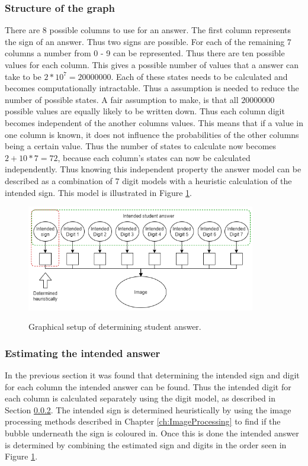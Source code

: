 \subsubsection{Structure of the graph}

There are 8 possible columns to use for an answer. The first column represents the sign of an answer. Thus two signs are possible. For each of the remaining 7 columns a number from 0 - 9 can be represented. Thus there are ten possible values for each column. This gives a possible number of values that a answer can take to be $2*10^7 = 20 000 000$. Each of these states needs to be calculated and becomes computationally intractable. Thus a assumption is needed to reduce the number of possible states. A fair assumption to make, is that all $20 000 000$ possible values are equally likely to be written down. Thus each column digit becomes independent of the another columns values. This means that if a value in one column is known, it does not influence the probabilities of the other columns being a certain value. Thus the number of states to calculate now becomes $2+10*7=72$, because each column's states can now be calculated independently. Thus knowing this independent property the answer model can be described as a combination of 7 digit models with a heuristic calculation of the intended sign. This model is illustrated in Figure \ref{fig:stdAns}.

\begin{figure}
  \centering
  \includegraphics[width=10cm]{ans}\\
  \caption{Graphical setup of determining student answer.}
  \label{fig:stdAns}
\end{figure}


\subsubsection{Estimating the intended answer}
\label{sec:intendedDigit}

In the previous section it was found that determining the intended sign and digit for each column the intended answer can be found. Thus the intended digit for each column is calculated separately using the digit model, as described in Section \ref{sec:intendedDigit}. The intended sign is determined heuristically by using the image processing methods described in Chapter \ref{ch:ImageProcessing} to find if the bubble underneath the sign is coloured in. Once this is done the intended answer is determined by combining the estimated sign and digits in the order seen in Figure \ref{fig:stdAns}.

